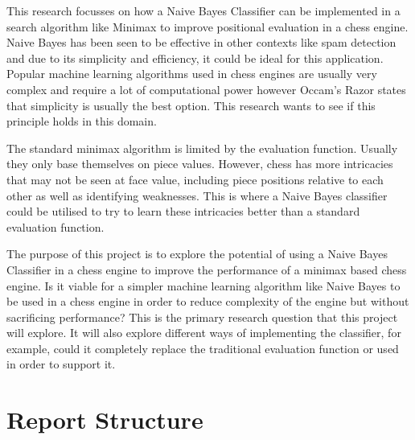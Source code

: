 \documentclass[20pt]{informatics-report}
\begin{document}
This research focusses on how a Naive Bayes Classifier can be implemented in a search algorithm like Minimax to improve positional evaluation in a chess engine. Naive Bayes has been seen to be effective in other contexts like spam detection and due to its simplicity and efficiency, it could be ideal for this application. Popular machine learning algorithms used in chess engines are usually very complex and require a lot of computational power however Occam's Razor states that simplicity is usually the best option. This research wants to see if this principle holds in this domain. 

The standard minimax algorithm is limited by the evaluation function. Usually they only base themselves on piece values. However, chess has more intricacies that may not be seen at face value, including piece positions relative to each other as well as identifying weaknesses. This is where a Naive Bayes classifier could be utilised to try to learn these intricacies better than a standard evaluation function.

The purpose of this project is to explore the potential of using a Naive Bayes Classifier in a chess engine to improve the performance of a minimax based chess engine. Is it viable for a simpler machine learning algorithm like Naive Bayes to be used in a chess engine in order to reduce complexity of the engine but without sacrificing performance? This is the primary research question that this project will explore. It will also explore different ways of implementing the classifier, for example, could it completely replace the traditional evaluation function or used in order to support it.




\section{Report Structure}
















\appendix



\end{document}
